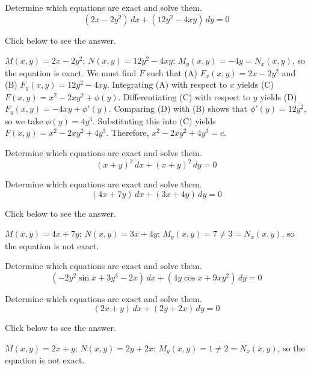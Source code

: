 \documentclass{ximera}
\begin{document}
\begin{problem}\label{exer:2.5.4} Determine which equations are exact and solve them.
$$(2x-2y^2)\,dx+(12y^2-4xy)\,dy=0$$

Click below to see the answer.

\begin{expandable}
    $M(x,y)=2x-2y^2$;\;
$N(x,y)=12y^2-4xy$;\;
$M_y(x,y)=-4y=N_x(x,y)$,
so the  equation is exact.
We must find $F$ such that
(A) $F_x(x,y)=2x-2y^2$ and
(B) $F_y(x,y)=12y^2-4xy$.
Integrating (A) with respect to $x$ yields
(C) $F(x,y)=x^2-2xy^2+\phi(y)$.
Differentiating (C) with respect to $y$  yields
(D) $F_y(x,y)=-4xy+\phi'(y)$.
Comparing (D) with (B)  shows that
$\phi'(y)=12y^2$, so we take
$\phi(y)=4y^3$.
Substituting this into (C) yields
$F(x,y)=x^2-2xy^2+4y^3$.
Therefore, $x^2-2xy^2+4y^3=c$.
\end{expandable}
\end{problem}

\begin{problem}\label{exer:2.5.5} Determine which equations are exact and solve them.
$$(x+y)^2\,dx+(x+y)^2\,dy=0$$
\end{problem}

\begin{problem}\label{exer:2.5.6} Determine which equations are exact and solve them.
$$(4x+7y)\,dx+(3x+4y)\,dy=0$$

Click below to see the answer.

\begin{expandable}
    $M(x,y)=4x+7y$;\;
$N(x,y)=3x+4y$;\;
$M_y(x,y)=7\neq 3=N_x(x,y)$,
so the  equation is not exact.
\end{expandable}
\end{problem}

\begin{problem}\label{exer:2.5.7} Determine which equations are exact and solve them.
$$(-2y^2\sin x+3y^3-2x)\,dx+(4y\cos x+9xy^2)\,dy=0$$
\end{problem}

\begin{problem}\label{exer:2.5.8} Determine which equations are exact and solve them.
$$(2x+y)\,dx+(2y+2x)\,dy=0$$

Click below to see the answer.

\begin{expandable}
    $M(x,y)=2x+y$;\;
$N(x,y)=2y+2x$;\;
$M_y(x,y)=1\neq 2=N_x(x,y)$,
so the  equation is not exact.
\end{expandable}
\end{problem}
\end{document}
